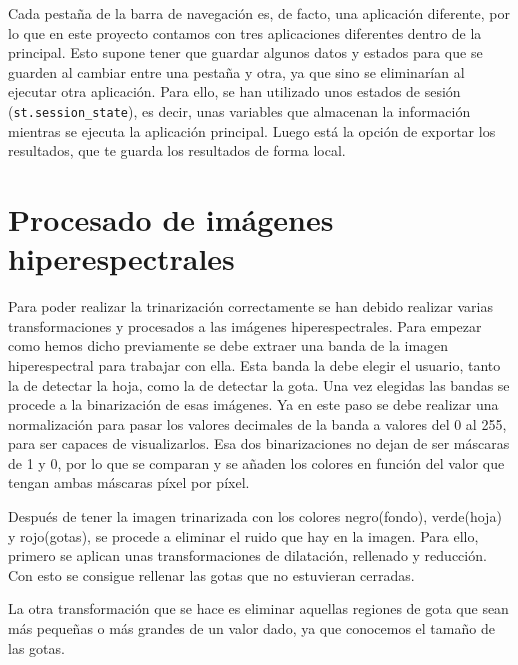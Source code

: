 Cada pestaña de la barra de navegación es, de facto, una aplicación diferente, por lo que en este proyecto contamos con tres aplicaciones diferentes dentro de la principal. Esto supone tener que guardar algunos datos y estados para que se guarden al cambiar entre una pestaña y otra, ya que sino se eliminarían al ejecutar otra aplicación. Para ello, se han utilizado unos estados de sesión (\verb|st.session_state|), es decir, unas variables que almacenan la información mientras se ejecuta la aplicación principal. Luego está la opción de exportar los resultados, que te guarda los resultados de forma local.

\section{Procesado de imágenes hiperespectrales}

Para poder realizar la trinarización correctamente se han debido realizar varias transformaciones y procesados a las imágenes hiperespectrales. Para empezar como hemos dicho previamente se debe extraer una banda de la imagen hiperespectral para trabajar con ella. Esta banda la debe elegir el usuario, tanto la de detectar la hoja, como la de detectar la gota. Una vez elegidas las bandas se procede a la binarización de esas imágenes. Ya en este paso se debe realizar una normalización para pasar los valores decimales de la banda a valores del 0 al 255, para ser capaces de visualizarlos. Esa dos binarizaciones no dejan de ser máscaras de 1 y 0, por lo que se comparan y se añaden los colores en función del valor que tengan ambas máscaras píxel por píxel.


Después de tener la imagen trinarizada con los colores negro(fondo), verde(hoja) y rojo(gotas), se procede a eliminar el ruido que hay en la imagen. Para ello, primero se aplican unas transformaciones de dilatación, rellenado y reducción. Con esto se consigue rellenar las gotas que no estuvieran cerradas. 


La otra transformación que se hace es eliminar aquellas regiones de gota que sean más pequeñas o más grandes de un valor dado, ya que conocemos el tamaño de las gotas.



